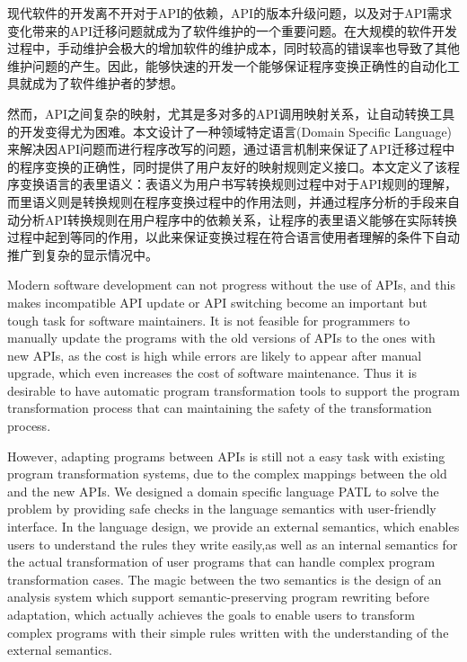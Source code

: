 
\begin{cabstract}
	现代软件的开发离不开对于API的依赖，API的版本升级问题，以及对于API需求变化带来的API迁移问题就成为了软件维护的一个重要问题。在大规模的软件开发过程中，手动维护会极大的增加软件的维护成本，同时较高的错误率也导致了其他维护问题的产生。因此，能够快速的开发一个能够保证程序变换正确性的自动化工具就成为了软件维护者的梦想。

	然而，API之间复杂的映射，尤其是多对多的API调用映射关系，让自动转换工具的开发变得尤为困难。本文设计了一种领域特定语言(Domain Specific Language)来解决因API问题而进行程序改写的问题，通过语言机制来保证了API迁移过程中的程序变换的正确性，同时提供了用户友好的映射规则定义接口。本文定义了该程序变换语言的表里语义：表语义为用户书写转换规则过程中对于API规则的理解，而里语义则是转换规则在程序变换过程中的作用法则，并通过程序分析的手段来自动分析API转换规则在用户程序中的依赖关系，让程序的表里语义能够在实际转换过程中起到等同的作用，以此来保证变换过程在符合语言使用者理解的条件下自动推广到复杂的显示情况中。
\end{cabstract}

\begin{eabstract}
	Modern software development can not progress without the use of APIs, and this makes incompatible API update or API switching become an important but tough task for software maintainers. It is not feasible for programmers to manually update the programs with the old versions of APIs to the ones with new APIs, as the cost is high while errors are likely to appear after manual upgrade, which even increases the cost of software maintenance. Thus it is desirable to have automatic program transformation tools to support the program transformation process that can maintaining the safety of the transformation process.

	However, adapting programs between APIs is still not a easy task with existing program transformation systems, due to the complex mappings between the old and the new APIs. We designed a domain specific language PATL to solve the problem by providing safe checks in the language semantics with user-friendly interface. In the language design, we provide an external semantics, which enables users to understand the rules they write easily,as well as an internal semantics for the actual transformation of user programs that can handle complex program transformation cases. The magic between the two semantics is the design of an analysis system which support semantic-preserving program rewriting before adaptation, which actually achieves the goals to enable users to transform complex programs with their simple rules written with the understanding of the external semantics.
\end{eabstract}

